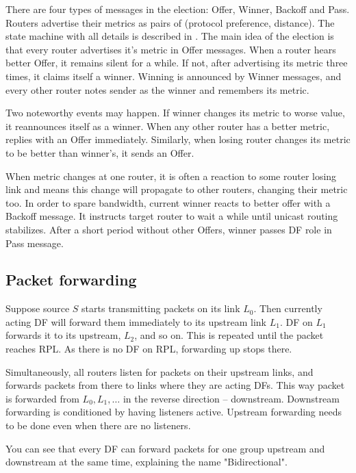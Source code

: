 There are four types of messages in the election: Offer, Winner, Backoff and
Pass. Routers advertise their metrics as pairs of (protocol preference, distance).
The state machine with all details is described in . The main idea of the
election is that every router advertises it's metric in Offer messages. When
a router hears better Offer, it remains silent for a while. If not, after
advertising its metric three times, it claims itself a winner. Winning is
announced by Winner messages, and every other router notes sender as the
winner and remembers its metric.

Two noteworthy events may happen. If winner changes its metric to worse value,
it reannounces itself as a winner. When any other router has a better metric,
replies with an Offer immediately. Similarly, when losing router changes its
metric to be better than winner's, it sends an Offer.

When metric changes at one router, it is often a reaction to some router losing
link and means this change will propagate to other routers, changing their
metric too. In order to spare bandwidth, current winner reacts to better offer
with a Backoff message. It instructs target router to wait a while until
unicast routing stabilizes. After a short period without other Offers, winner
passes DF role in Pass message.


\subsection{Packet forwarding}

Suppose source $S$ starts transmitting packets on its link $L_0$. Then
currently acting DF will forward them immediately to its upstream link $L_1$.
DF on $L_1$ forwards it to its upstream, $L_2$, and so on. This is repeated
until the packet reaches RPL. As there is no DF on RPL, forwarding up stops
there.

Simultaneously, all routers listen for packets on their upstream links, and
forwards packets from there to links where they are acting DFs. This way packet
is forwarded from $L_0, L_1, \dots$ in the reverse direction -- downstream.
Downstream forwarding is conditioned by having listeners active. Upstream
forwarding needs to be done even when there are no listeners.

You can see that every DF can forward packets for one group upstream and
downstream at the same time, explaining the name "Bidirectional".

